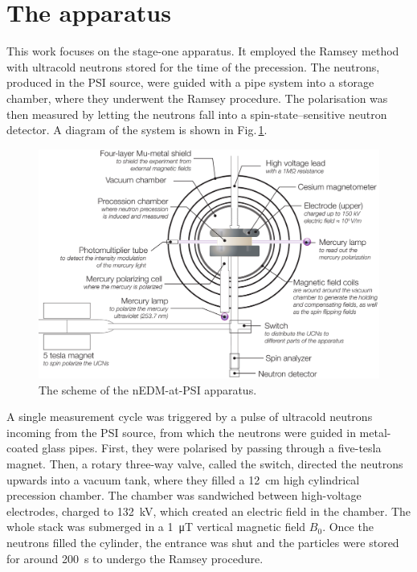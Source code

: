 \section{The apparatus}
This work focuses on the stage-one apparatus. It employed the Ramsey method with ultracold neutrons stored for the time of the precession. The neutrons, produced in the PSI source, were guided with a pipe system into a storage chamber, where they underwent the Ramsey procedure. The polarisation was then measured by letting the neutrons fall into a spin-state--sensitive neutron detector. A diagram of the system is shown in Fig.\,\ref{fig:nEDM_scheme}.

\begin{figure}
  \centering
  \includegraphics[width=\linewidth]{gfx/nEDMatPSI/apparatus-cartoon-main-and-sub-labels.pdf}
  \caption{The scheme of the nEDM-at-PSI apparatus.  }\label{fig:nEDM_scheme}
\end{figure}

A single measurement cycle was triggered by a pulse of ultracold neutrons incoming from the PSI source, from which the neutrons were guided in metal-coated glass pipes. First, they were polarised by passing through a five-tesla magnet. Then, a rotary three-way valve, called the switch, directed the neutrons upwards into a vacuum tank, where they filled a \SI{12}{\centi\meter} high cylindrical precession chamber. The chamber was sandwiched between high-voltage electrodes, charged to \SI{132}{\kilo\volt}, which created an electric field in the chamber. The whole stack was submerged in a \SI{1}{\micro\tesla} vertical magnetic field $B_0$. Once the neutrons filled the cylinder, the entrance was shut and the particles were stored for around \SI{200}{\second} to undergo the Ramsey procedure.

